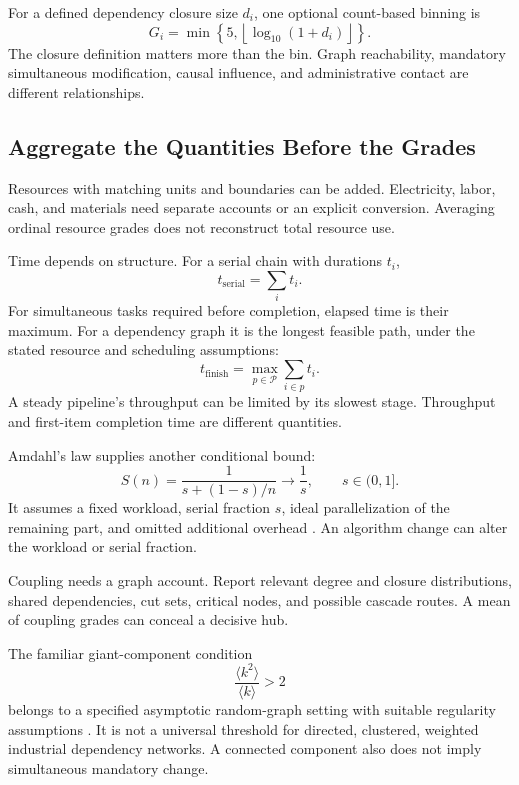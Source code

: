 \documentclass[11pt,openany]{book}
\begin{document}
For a defined dependency closure size $d_i$, one optional count-based binning is
\begin{equation}
 G_i=\min\left\{5,\left\lfloor\log_{10}(1+d_i)\right\rfloor\right\}.
\end{equation}
The closure definition matters more than the bin. Graph reachability, mandatory simultaneous modification, causal influence, and administrative contact are different relationships.

\subsection{Aggregate the Quantities Before the Grades}

Resources with matching units and boundaries can be added. Electricity, labor, cash, and materials need separate accounts or an explicit conversion. Averaging ordinal resource grades does not reconstruct total resource use.

Time depends on structure. For a serial chain with durations $t_i$,
\begin{equation}
 t_{\mathrm{serial}}=\sum_i t_i.
\end{equation}
For simultaneous tasks required before completion, elapsed time is their maximum. For a dependency graph it is the longest feasible path, under the stated resource and scheduling assumptions:
\begin{equation}
 t_{\mathrm{finish}}
 =\max_{p\in\mathcal P}\sum_{i\in p}t_i.
\end{equation}
A steady pipeline's throughput can be limited by its slowest stage. Throughput and first-item completion time are different quantities.

Amdahl's law supplies another conditional bound:
\begin{equation}
 S(n)=\frac{1}{s+(1-s)/n}\longrightarrow\frac1s,
 \qquad s\in(0,1].
\end{equation}
It assumes a fixed workload, serial fraction $s$, ideal parallelization of the remaining part, and omitted additional overhead \cite{amdahl1967validity}. An algorithm change can alter the workload or serial fraction.

Coupling needs a graph account. Report relevant degree and closure distributions, shared dependencies, cut sets, critical nodes, and possible cascade routes. A mean of coupling grades can conceal a decisive hub.

The familiar giant-component condition
\begin{equation}
 \frac{\langle k^2\rangle}{\langle k\rangle}>2
\end{equation}
belongs to a specified asymptotic random-graph setting with suitable regularity assumptions \cite{molloy1995critical}. It is not a universal threshold for directed, clustered, weighted industrial dependency networks. A connected component also does not imply simultaneous mandatory change.
\end{document}
